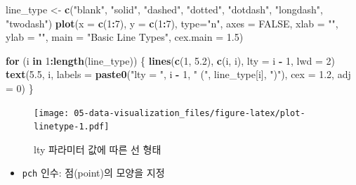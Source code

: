 \documentclass[
  11pt,
]{krantz}
\newenvironment{Shaded}{\begin{snugshade}}{\end{snugshade}}
\newcommand{\ControlFlowTok}[1]{\textcolor[rgb]{0.27,0.27,0.27}{\textbf{#1}}}
\newcommand{\DataTypeTok}[1]{\textcolor[rgb]{0.27,0.27,0.27}{#1}}
\newcommand{\DecValTok}[1]{\textcolor[rgb]{0.06,0.06,0.06}{#1}}
\newcommand{\FloatTok}[1]{\textcolor[rgb]{0.06,0.06,0.06}{#1}}
\newcommand{\KeywordTok}[1]{\textcolor[rgb]{0.27,0.27,0.27}{\textbf{#1}}}
\newcommand{\NormalTok}[1]{#1}
\newcommand{\OperatorTok}[1]{\textcolor[rgb]{0.43,0.43,0.43}{\textbf{#1}}}
\newcommand{\OtherTok}[1]{\textcolor[rgb]{0.37,0.37,0.37}{#1}}
\newcommand{\StringTok}[1]{\textcolor[rgb]{0.5,0.5,0.5}{#1}}
\providecommand{\tightlist}{%
  \setlength{\itemsep}{0pt}\setlength{\parskip}{0pt}}
\begin{document}
\footnotesize

\begin{Shaded}
\begin{Highlighting}[]
\NormalTok{line_type <-}\StringTok{ }\KeywordTok{c}\NormalTok{(}\StringTok{"blank"}\NormalTok{, }\StringTok{"solid"}\NormalTok{, }\StringTok{"dashed"}\NormalTok{, }\StringTok{"dotted"}\NormalTok{,}
               \StringTok{"dotdash"}\NormalTok{, }\StringTok{"longdash"}\NormalTok{, }\StringTok{"twodash"}\NormalTok{)}
\KeywordTok{plot}\NormalTok{(}\DataTypeTok{x =} \KeywordTok{c}\NormalTok{(}\DecValTok{1}\OperatorTok{:}\DecValTok{7}\NormalTok{), }\DataTypeTok{y =} \KeywordTok{c}\NormalTok{(}\DecValTok{1}\OperatorTok{:}\DecValTok{7}\NormalTok{), }\DataTypeTok{type=}\StringTok{"n"}\NormalTok{, }
     \DataTypeTok{axes =} \OtherTok{FALSE}\NormalTok{, }
     \DataTypeTok{xlab =} \StringTok{""}\NormalTok{, }
     \DataTypeTok{ylab =} \StringTok{""}\NormalTok{, }
     \DataTypeTok{main =} \StringTok{"Basic Line Types"}\NormalTok{, }
     \DataTypeTok{cex.main =} \FloatTok{1.5}\NormalTok{)}

\ControlFlowTok{for}\NormalTok{ (i }\ControlFlowTok{in} \DecValTok{1}\OperatorTok{:}\KeywordTok{length}\NormalTok{(line_type)) \{}
  \KeywordTok{lines}\NormalTok{(}\KeywordTok{c}\NormalTok{(}\DecValTok{1}\NormalTok{, }\FloatTok{5.2}\NormalTok{), }\KeywordTok{c}\NormalTok{(i, i), }\DataTypeTok{lty =}\NormalTok{ i }\OperatorTok{-}\StringTok{ }\DecValTok{1}\NormalTok{, }\DataTypeTok{lwd =} \DecValTok{2}\NormalTok{)  }
  \KeywordTok{text}\NormalTok{(}\FloatTok{5.5}\NormalTok{, i, }
       \DataTypeTok{labels =} \KeywordTok{paste0}\NormalTok{(}\StringTok{"lty = "}\NormalTok{, i }\OperatorTok{-}\StringTok{ }\DecValTok{1}\NormalTok{, }\StringTok{" ("}\NormalTok{, }
\NormalTok{                       line_type[i], }\StringTok{")"}\NormalTok{), }
       \DataTypeTok{cex =} \FloatTok{1.2}\NormalTok{, }
       \DataTypeTok{adj =} \DecValTok{0}\NormalTok{)}
\NormalTok{\}}
\end{Highlighting}
\end{Shaded}

\begin{figure}
\centering
\texttt{[image: 05-data-visualization\_files/figure-latex/plot-linetype-1.pdf]}
\caption{\label{fig:plot-linetype}lty 파라미터 값에 따른 선 형태}
\end{figure}

\normalsize

\begin{itemize}
\tightlist
\item
  \texttt{pch} 인수: 점(point)의 모양을 지정
\end{itemize}
\end{document}
